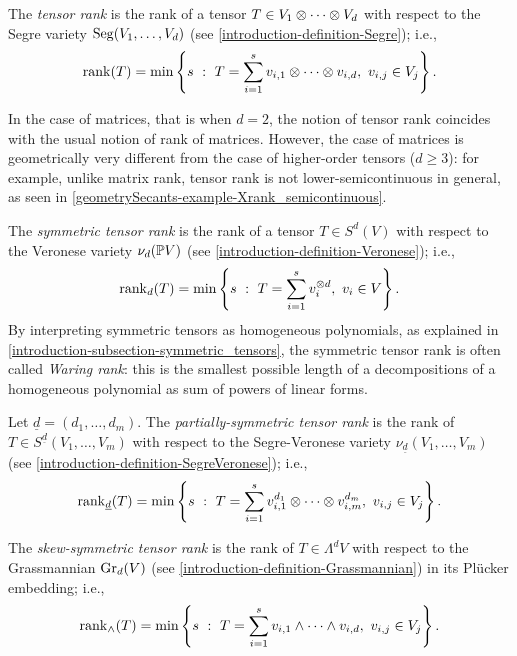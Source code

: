  \begin{definition}
 \label{geometrySecants-definition-tensor_rank}
     The \emph{tensor rank} is the rank of a tensor $T \in V_1 \otimes \cdots \otimes V_d$ with respect to the Segre variety $\mathrm{Seg}(V_1,\ldots,V_d)$ (see \ref{introduction-definition-Segre}); i.e., 
     \[
         \mathrm{rank}(T) = \min\left\{s ~:~ T = \sum_{i=1}^s v_{i,1}\otimes \cdots \otimes v_{i,d}, ~ v_{i,j} \in V_j\right\}.
     \]
 \end{definition}
\begin{example}
 \label{geometrySecants-example-tensor_rank}
In the case of matrices, that is when $d=2$, the notion of tensor rank coincides with the usual notion of rank of matrices. However, the case of matrices is geometrically very different from the case of higher-order tensors ($d\geq 3$): for example, unlike matrix rank, tensor rank is not lower-semicontinuous in general, as seen in \ref{geometrySecants-example-Xrank_semicontinuous}. 
\end{example}
 
 \begin{definition}
 \label{geometrySecants-definition-symmetric_tensor_rank}
     The \emph{symmetric tensor rank} is the rank of a tensor $T \in S^d(V)$ with respect to the Veronese variety $\nu_d(\mathbb{P} V)$ (see \ref{introduction-definition-Veronese}); i.e., 
     \[
         \mathrm{rank}_d(T) = \min\left\{s ~:~ T = \sum_{i=1}^s v_{i}^{\otimes d}, ~ v_{i} \in V\right\}.
     \]
     By interpreting symmetric tensors as homogeneous polynomials, as explained in \ref{introduction-subsection-symmetric_tensors}, the symmetric tensor rank is often called \emph{Waring rank}: this is the smallest possible length of a decompositions of a homogeneous polynomial as sum of powers of linear forms.
 \end{definition}  
 
 \begin{definition}
 \label{geometrySecants-definition-partially_symmetric_tensor_rank}
     Let $\underline{d} = (d_1,\ldots,d_m)$. The \emph{partially-symmetric tensor rank} is the rank of $T \in S^{\underline{d}}(V_1,\ldots,V_m)$ with respect to the Segre-Veronese variety $\nu_{\underline{d}}(V_1,\ldots,V_m)$ (see \ref{introduction-definition-SegreVeronese}); i.e., 
     \[
         \mathrm{rank}_{\underline{d}}(T) = \min\left\{s ~:~ T = \sum_{i=1}^s v_{i,1}^{d_1}\otimes \cdots \otimes v_{i,m}^{d_m}, ~ v_{i,j} \in V_j\right\}.
     \]
 \end{definition}
 
 \begin{definition}
 \label{geometrySecants-definition-skewsymmetric_tensor_rank}
     The \emph{skew-symmetric tensor rank} is the rank of $T \in \Lambda^dV$ with respect to the Grassmannian $\mathrm{Gr}_d(V)$ (see \ref{introduction-definition-Grassmannian}) in its Pl\"ucker embedding; i.e., 
     \[
         \mathrm{rank}_{\wedge}(T) = \min\left\{s ~:~ T = \sum_{i=1}^s v_{i,1}\wedge \dots \wedge v_{i,d}, ~ v_{i,j} \in V_j\right\}.
     \]
 \end{definition}
